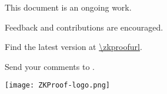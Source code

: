 \label{prelim:cover}
\begin{center}
\vspace*{5em}
{\bfseries\Huge \zkpcomreftitle}


\vspace{1em} \scalebox{1.15}{Version \zkpcomrefversion}
  


\vspace{2em}
\todayext


\vfill
This document is an ongoing work.

Feedback and contributions are encouraged.

Find the latest version at \url{\zkproofurl}.


Send your comments to \href{mailto:\zkpcomrefeditorsemail}{\zkpcomrefeditorsemail}.

\vfill

\texttt{[image: ZKProof-logo.png]}

\vspace{3em}

\end{center}
